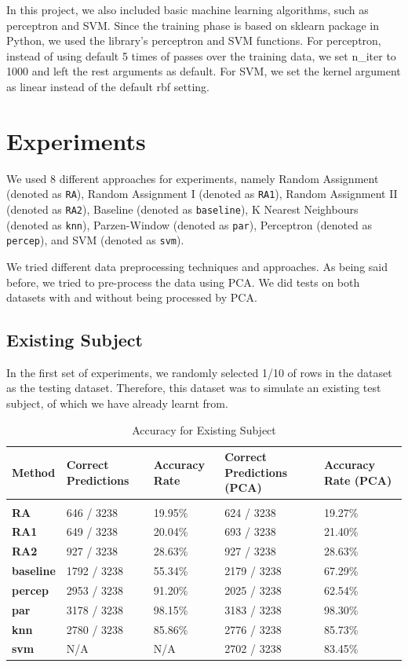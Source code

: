 \documentclass{article} %
\begin{document}
In this project, we also included basic machine learning algorithms, such as perceptron and SVM. Since the training phase is based on sklearn package in Python, we used the library’s perceptron and SVM functions. For perceptron, instead of using default 5 times of passes over the training data, we set n\_iter to 1000 and left the rest arguments as default. For SVM, we set the kernel argument as linear instead of the default rbf setting.

\section{Experiments}

We used 8 different approaches for experiments, namely Random Assignment (denoted as \texttt{RA}), Random Assignment I (denoted as \texttt{RA1}), Random Assignment II (denoted as \texttt{RA2}), Baseline (denoted as \texttt{baseline}), K Nearest Neighbours (denoted as \texttt{knn}), Parzen-Window (denoted as \texttt{par}), Perceptron (denoted as \texttt{percep}), and SVM (denoted as \texttt{svm}).

We tried different data preprocessing techniques and approaches. As being said before, we tried to pre-process the data using PCA. We did tests on both datasets with and without being processed by PCA.

\subsection{Existing Subject}

In the first set of experiments, we randomly selected 1/10 of rows in the dataset as the testing dataset. Therefore, this dataset was to simulate an existing test subject, of which we have already learnt from.

\begin{table}[H]
\caption{Accuracy for Existing Subject}
\begin{center}
\begin{tabular}{l||ll|ll}
{\bf Method} & {\bf Correct Predictions} & {\bf Accuracy Rate} & {\bf Correct Predictions (PCA)} & {\bf Accuracy Rate (PCA)} \\
\hline &&&& \\
{\bf RA}       &  646 / 3238 & 19.95\% &  624 / 3238 & 19.27\% \\
{\bf RA1}      &  649 / 3238 & 20.04\% &  693 / 3238 & 21.40\% \\
{\bf RA2}      &  927 / 3238 & 28.63\% &  927 / 3238 & 28.63\% \\
{\bf baseline} & 1792 / 3238 & 55.34\% & 2179 / 3238 & 67.29\% \\
{\bf percep}   & 2953 / 3238 & 91.20\% & 2025 / 3238 & 62.54\% \\
{\bf par}      & 3178 / 3238 & 98.15\% & 3183 / 3238 & 98.30\% \\
{\bf knn}      & 2780 / 3238 & 85.86\% & 2776 / 3238 & 85.73\% \\
{\bf svm}      &     N/A     &     N/A & 2702 / 3238 & 83.45\% \\
\end{tabular}
\end{center}
\end{table}
\end{document}
